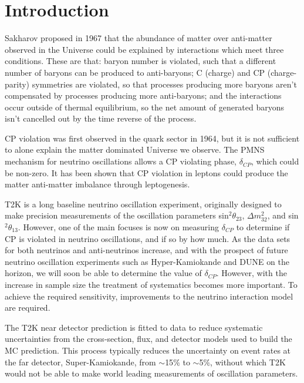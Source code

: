\chapter{Introduction} \label{sec:introductions}

Sakharov proposed in 1967\cite{sakharov} that the abundance of matter over anti-matter observed in the Universe could be explained by interactions which meet three conditions. These are that: baryon number is violated, such that a different number of baryons can be produced to anti-baryons; C (charge) and CP (charge-parity) symmetries are violated, so that processes producing more baryons aren't compensated by processes producing more anti-baryons; and the interactions occur outside of thermal equilibrium, so the net amount of generated baryons isn't cancelled out by the time reverse of the process. 

CP violation was first observed in the quark sector in 1964\cite{quarkcpv}, but it is not sufficient to alone explain the matter dominated Universe we observe. The PMNS mechanism for neutrino oscillations allows a CP violating phase, $\delta_{CP}$, which could be non-zero. It has been shown that CP violation in leptons could produce the matter anti-matter imbalance through leptogenesis\cite{leptogenesis}. 

T2K \cite{PhysRevLett.121.171802} is a long baseline neutrino oscillation experiment, originally designed to make precision measurements of the oscillation parameters sin$^2\theta_{23}$, $\Delta m^2_{32}$, and sin$^2\theta_{13}$. However, one of the main focuses is now on measuring $\delta_{CP}$ to determine if CP is violated in neutrino oscillations, and if so by how much. As the data sets for both neutrinos and anti-neutrinos increase, and with the prospect of future neutrino oscillation experiments such as Hyper-Kamiokande \cite{Abe:2018uyc} and DUNE \cite{acciarri2016longbaseline} on the horizon, we will soon be able to determine the value of  $\delta_{CP}$. However, with the increase in sample size the treatment of systematics becomes more important. To achieve the required sensitivity, improvements to the neutrino interaction model are required.

The T2K near detector prediction is fitted to data to reduce systematic uncertainties from the cross-section, flux, and detector models used to build the MC prediction. This process typically reduces the uncertainty on event rates at the far detector, Super-Kamiokande, from $\sim$15$\%$ to $\sim$5$\%$, without which T2K would not be able to make world leading measurements of oscillation parameters.

